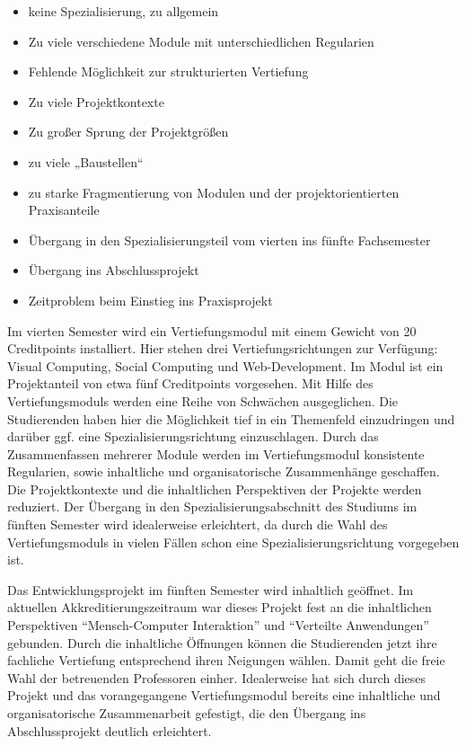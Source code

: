\begin{itemize}
\tightlist
\item
  keine Spezialisierung, zu allgemein
\item
  Zu viele verschiedene Module mit unterschiedlichen Regularien
\item
  Fehlende Möglichkeit zur strukturierten Vertiefung
\item
  Zu viele Projektkontexte
\item
  Zu großer Sprung der Projektgrößen
\item
  zu viele „Baustellen``
\item
  zu starke Fragmentierung von Modulen und der projektorientierten
  Praxisanteile
\item
  Übergang in den Spezialisierungsteil vom vierten ins fünfte
  Fachsemester
\item
  Übergang ins Abschlussprojekt
\item
  Zeitproblem beim Einstieg ins Praxisprojekt
\end{itemize}

Im vierten Semester wird ein Vertiefungsmodul mit einem Gewicht von 20
Creditpoints installiert. Hier stehen drei Vertiefungsrichtungen zur
Verfügung: Visual Computing, Social Computing und Web-Development. Im
Modul ist ein Projektanteil von etwa fünf Creditpoints vorgesehen. Mit
Hilfe des Vertiefungsmoduls werden eine Reihe von Schwächen
ausgeglichen. Die Studierenden haben hier die Möglichkeit tief in ein
Themenfeld einzudringen und darüber ggf. eine Spezialisierungsrichtung
einzuschlagen. Durch das Zusammenfassen mehrerer Module werden im
Vertiefungsmodul konsistente Regularien, sowie inhaltliche und
organisatorische Zusammenhänge geschaffen. Die Projektkontexte und die
inhaltlichen Perspektiven der Projekte werden reduziert. Der Übergang in
den Spezialisierungsabschnitt des Studiums im fünften Semester wird
idealerweise erleichtert, da durch die Wahl des Vertiefungsmoduls in
vielen Fällen schon eine Spezialisierungsrichtung vorgegeben ist.

Das Entwicklungsprojekt im fünften Semester wird inhaltlich geöffnet. Im
aktuellen Akkreditierungszeitraum war dieses Projekt fest an die
inhaltlichen Perspektiven ``Mensch-Computer Interaktion'' und
``Verteilte Anwendungen'' gebunden. Durch die inhaltliche Öffnungen
können die Studierenden jetzt ihre fachliche Vertiefung entsprechend
ihren Neigungen wählen. Damit geht die freie Wahl der betreuenden
Professoren einher. Idealerweise hat sich durch dieses Projekt und das
vorangegangene Vertiefungsmodul bereits eine inhaltliche und
organisatorische Zusammenarbeit gefestigt, die den Übergang ins
Abschlussprojekt deutlich erleichtert.

